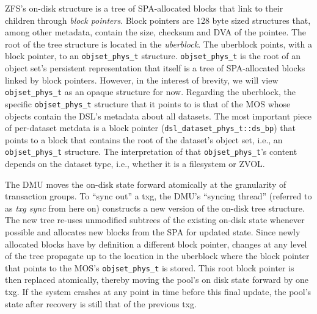 \documentclass[12pt,a4paper,twoside]{book}
\begin{document}
ZFS's on-disk structure is a tree of SPA-allocated blocks that link to their children through \textit{block pointers}.
Block pointers are 128 byte sized structures that, among other metadata, contain the size, checksum and DVA of the pointee.
The root of the tree structure is located in the \textit{uberblock}.
The uberblock points, with a block pointer, to an \lstinline{objset_phys_t} structure.
\lstinline{objset_phys_t} is the root of an object set's persistent representation that itself is a tree of SPA-allocated blocks linked by block pointers.
However, in the interest of brevity, we will view \lstinline{objset_phys_t} as an opaque structure for now.
Regarding the uberblock, the specific \lstinline{objset_phys_t} structure that it points to is that of the MOS whose objects contain the DSL's metadata about all datasets.
The most important piece of per-dataset metdata is a block pointer (\lstinline{dsl_dataset_phys_t::ds_bp}) that points to a block that contains the root of the dataset's object set, i.e., an \lstinline{objset_phys_t} structure.
The interpretation of that \lstinline{objset_phys_t}'s content depends on the dataset type, i.e., whether it is a filesystem or ZVOL.

The DMU moves the on-disk state forward atomically at the granularity of transaction groups.
To ``sync out'' a txg, the DMU's ``syncing thread'' (referred to as \textit{txg sync} from here on) constructs a new version of the on-disk tree structure.
The new tree re-uses unmodified subtrees of the existing on-disk state whenever possible and allocates new blocks from the SPA for updated state.
Since newly allocated blocks have by definition a different block pointer, changes at any level of the tree propagate up to the location in the uberblock where the block pointer that points to the MOS's \lstinline{objset_phys_t} is stored.
This root block pointer is then replaced atomically, thereby moving the pool's on disk state forward by one txg.
If the system crashes at any point in time before this final update, the pool's state after recovery is still that of the previous txg.
\end{document}
